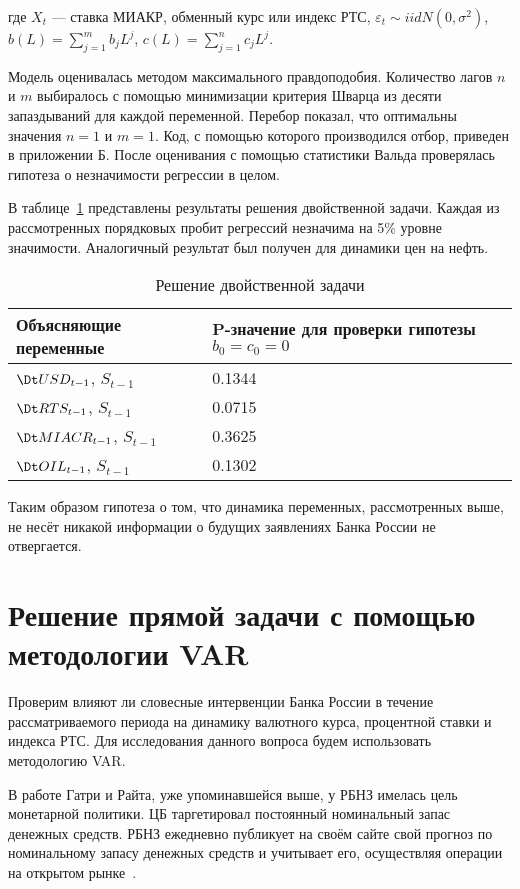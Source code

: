 \documentclass[14pt,a4paper, oneside]{extreport}
\begin{document}
где $X_{t}$ --- ставка МИАКР, обменный курс или индекс РТС, $\varepsilon_t \sim iid N (0, \sigma^2)$, $b(L) = \sum_{j=1}^m b_j L^j$, $c(L) = \sum_{j=1}^n c_j L^j$.

Модель оценивалась методом максимального правдоподобия. Количество лагов $n$ и $m$ выбиралось с помощью минимизации критерия Шварца из десяти запаздываний для каждой переменной. Перебор показал, что оптимальны значения $n=1$ и $m=1$. Код, с помощью которого производился отбор, приведен в приложении Б. После оценивания с помощью статистики Вальда проверялась гипотеза о незначимости регрессии в целом.

В таблице~\ref{stask} представлены результаты решения двойственной задачи. Каждая из рассмотренных порядковых пробит регрессий незначима на 5\% уровне значимости. Аналогичный результат был получен для динамики цен на нефть. 

\begin{table}[H]
	\begin{center}
		\caption{Решение двойственной задачи}\label{stask}
		\begin{tabular}{|m{6cm}|m{4cm}|}
\hline
Объясняющие переменные & P-значение для проверки гипотезы $b_0 = c_0 =0$  \\ \hline
$\Dt USD_{t-1}$, $S_{t-1}$ & 0.1344   \\ \hline
$\Dt RTS_{t-1}$, $S_{t-1}$ & 0.0715   \\ \hline
$\Dt MIACR_{t-1}$, $S_{t-1}$ & 0.3625   \\ \hline
$\Dt OIL_{t-1}$, $S_{t-1}$ & 0.1302   \\ \hline
		\end{tabular}
	\end{center}
\end{table}

Таким образом гипотеза о том, что динамика переменных, рассмотренных выше, не несёт никакой информации о будущих заявлениях Банка России не отвергается.


\section{Решение прямой задачи с помощью методологии VAR}

Проверим влияют ли словесные интервенции Банка России в течение рассматриваемого периода на динамику валютного курса, процентной ставки и индекса РТС. Для исследования данного вопроса будем использовать методологию VAR.

В работе Гатри и Райта, уже упоминавшейся выше, у РБНЗ имелась цель монетарной политики. ЦБ таргетировал постоянный номинальный запас денежных средств. РБНЗ ежедневно публикует на своём сайте свой прогноз по номинальному запасу денежных средств и учитывает его, осуществляя операции на открытом рынке~\cite{guthrie2000open}. 
\end{document}
